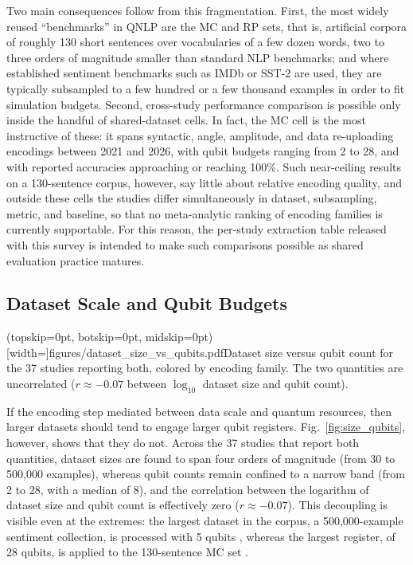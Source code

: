 \documentclass{ieeeaccess}
\begin{document}
Two main consequences follow from this fragmentation. First, the most widely reused ``benchmarks'' in QNLP are the MC and RP sets, that is, artificial corpora of roughly 130 short sentences over vocabularies of a few dozen words, two to three orders of magnitude smaller than standard NLP benchmarks; and where established sentiment benchmarks such as IMDb or SST-2 are used, they are typically subsampled to a few hundred or a few thousand examples in order to fit simulation budgets. Second, cross-study performance comparison is possible only inside the handful of shared-dataset cells. In fact, the MC cell is the most instructive of these: it spans syntactic, angle, amplitude, and data re-uploading encodings between 2021 and 2026, with qubit budgets ranging from 2 to 28, and with reported accuracies approaching or reaching 100\%. Such near-ceiling results on a 130-sentence corpus, however, say little about relative encoding quality, and outside these cells the studies differ simultaneously in dataset, subsampling, metric, and baseline, so that no meta-analytic ranking of encoding families is currently supportable. For this reason, the per-study extraction table released with this survey is intended to make such comparisons possible as shared evaluation practice matures.

\subsection{Dataset Scale and Qubit Budgets}
\label{subsec:scale_qubits}

\Figure[t!](topskip=0pt, botskip=0pt, midskip=0pt)[width=\textwidth]{figures/dataset_size_vs_qubits.pdf}{Dataset size versus qubit count for the 37 studies reporting both, colored by encoding family. The two quantities are uncorrelated ($r \approx -0.07$ between $\log_{10}$ dataset size and qubit count).\label{fig:size_qubits}}

If the encoding step mediated between data scale and quantum resources, then larger datasets should tend to engage larger qubit registers. Fig.~\ref{fig:size_qubits}, however, shows that they do not. Across the 37 studies that report both quantities, dataset sizes are found to span four orders of magnitude (from 30 to 500{,}000 examples), whereas qubit counts remain confined to a narrow band (from 2 to 28, with a median of 8), and the correlation between the logarithm of dataset size and qubit count is effectively zero ($r \approx -0.07$). This decoupling is visible even at the extremes: the largest dataset in the corpus, a 500{,}000-example sentiment collection, is processed with 5 qubits \cite{rawat_mental_2026}, whereas the largest register, of 28 qubits, is applied to the 130-sentence MC set \cite{he_training_2024}.
\end{document}
